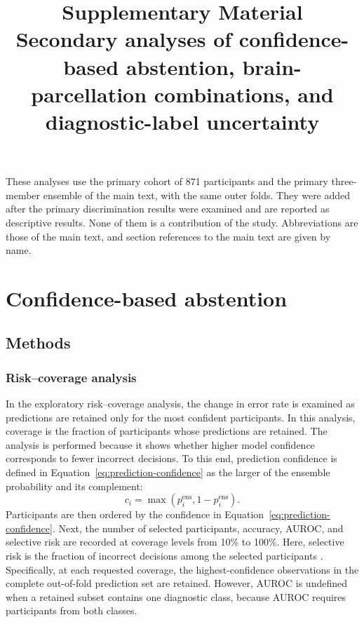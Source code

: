 \documentclass[11pt,a4paper]{article}
\title{Supplementary Material\\[0.3em]\large Secondary analyses of confidence-based abstention, brain-parcellation combinations, and diagnostic-label uncertainty}
\author{}
\date{}
\begin{document}
\maketitle

\noindent These analyses use the primary cohort of 871 participants and the primary three-member ensemble of the main text, with the same outer folds. They were added after the primary discrimination results were examined and are reported as descriptive results. None of them is a contribution of the study. Abbreviations are those of the main text, and section references to the main text are given by name.

\section{Confidence-based abstention}
\label{sec:supp-abstention}

\subsection{Methods}

\subsubsection*{Risk--coverage analysis}
In the exploratory risk--coverage analysis, the change in error rate is examined as predictions are retained only for the most confident participants. In this analysis, coverage is the fraction of participants whose predictions are retained. The analysis is performed because it shows whether higher model confidence corresponds to fewer incorrect decisions. To this end, prediction confidence is defined in Equation~\eqref{eq:prediction-confidence} as the larger of the ensemble probability and its complement:
\begin{equation}
c_i
=
\max\left(p_i^{\mathrm{ens}},1-p_i^{\mathrm{ens}}\right).
\label{eq:prediction-confidence}
\end{equation}
Participants are then ordered by the confidence in Equation~\eqref{eq:prediction-confidence}. Next, the number of selected participants, accuracy, AUROC, and selective risk are recorded at coverage levels from 10\% to 100\%. Here, selective risk is the fraction of incorrect decisions among the selected participants \citep{GeifmanElYaniv2017}. Specifically, at each requested coverage, the highest-confidence observations in the complete out-of-fold prediction set are retained. However, AUROC is undefined when a retained subset contains one diagnostic class, because AUROC requires participants from both classes.
\end{document}
